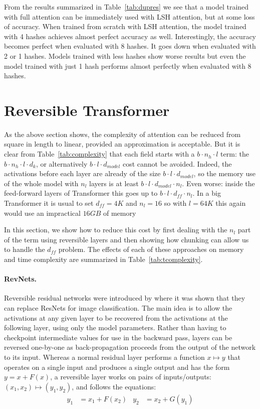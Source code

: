 From the results summarized in Table~\ref{tab:dupres} we see that
a model trained with full attention can be immediately used with LSH
attention, but at some loss of accuracy. When trained from scratch
with LSH attention, the model trained with 4 hashes achieves almost
perfect accuracy as well. Interestingly, the accuracy becomes perfect
when evaluated with 8 hashes. It goes down when evaluated with 2 or 1
hashes. Models trained with less hashes show worse results but even
the model trained with just 1 hash performs almost perfectly when
evaluated with 8 hashes.

\section{Reversible Transformer} \label{sec:reversible}

As the above section shows, the complexity of attention can be reduced
from square in length to linear, provided an approximation is acceptable.
But it is clear from Table~\ref{tab:complexity} that each field starts
with a $b\cdot n_h\cdot l$ term: the $b\cdot n_h\cdot l\cdot d_k$, 
or alternatively $b\cdot l\cdot d_{model}$ cost
cannot be avoided. Indeed, the activations before each layer are already
of the size $b\cdot l\cdot d_{model}$, so the memory use of the whole model with $n_l$
layers is at least $b\cdot l\cdot d_{model}\cdot n_l$. Even worse: inside the feed-forward layers of 
Transformer this goes up to $b\cdot l\cdot d_{ff}\cdot n_l$. In a big Transformer
it is usual to set $d_{ff}=4K$ and $n_l=16$ so with $l=64K$ this again
would use an impractical $16GB$ of memory

In this section, we show how to reduce this cost by first dealing with the
$n_l$ part of the term using reversible layers and then showing how chunking
can allow us to handle the $d_{ff}$ problem.
The effects of each of these approaches on memory and time complexity are summarized in Table~\ref{tab:tcomplexity}.

\paragraph{RevNets.}
Reversible residual networks were introduced by \citet{gomez2017reversible} where it was shown
that they can replace ResNets for image classification.
The main idea is to allow the activations at any given layer to be recovered from the activations at the following layer, using only the model parameters. Rather than having to checkpoint intermediate values for use in the backward pass, layers can be reversed one-by-one as back-propagation proceeds from the output of the network to its input. Whereas a normal residual layer performs a function $x \mapsto y$ that operates on a single input and produces a single output and has the form $y = x + F(x)$, a reversible layer works on pairs of inputs/outputs: $(x_1, x_2) \mapsto (y_1, y_2)$, and follows the equations:
\begin{align}
    y_1 &= x_1 + F(x_2) &
    y_2 &= x_2 + G(y_1)
\end{align}

